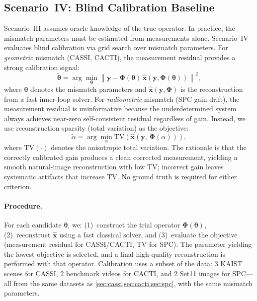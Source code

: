\documentclass[runningheads]{llncs}
\begin{document}


\subsection{Scenario~IV: Blind Calibration Baseline}
\label{sec:scenario_iv}

Scenario~III assumes oracle knowledge of the true operator.
In practice, the mismatch parameters must be estimated from measurements alone.
Scenario~IV evaluates blind calibration via grid search over mismatch parameters.
For \emph{geometric} mismatch (CASSI, CACTI), the measurement residual provides a strong calibration signal:
\begin{equation}
    \tilde{\boldsymbol{\theta}} = \arg\min_{\boldsymbol{\theta}} \left\| \mathbf{y} - \mathbf{\Phi}(\boldsymbol{\theta})\, \hat{\mathbf{x}}\!\left(\mathbf{y}, \mathbf{\Phi}(\boldsymbol{\theta})\right) \right\|^2,
    \label{eq:scenario_iv}
\end{equation}
where $\boldsymbol{\theta}$ denotes the mismatch parameters and $\hat{\mathbf{x}}(\mathbf{y}, \mathbf{\Phi})$ is the reconstruction from a fast inner-loop solver.
For \emph{radiometric} mismatch (SPC gain drift), the measurement residual is uninformative because the underdetermined system always achieves near-zero self-consistent residual regardless of gain.
Instead, we use reconstruction sparsity (total variation) as the objective:
\begin{equation}
    \tilde{\alpha} = \arg\min_{\alpha} \mathrm{TV}\!\left(\hat{\mathbf{x}}\!\left(\mathbf{y},\, \mathbf{\Phi}(\alpha)\right)\right),
    \label{eq:scenario_iv_tv}
\end{equation}
where $\mathrm{TV}(\cdot)$ denotes the anisotropic total variation.
The rationale is that the correctly calibrated gain produces a clean corrected measurement, yielding a smooth natural-image reconstruction with low TV; incorrect gain leaves systematic artifacts that increase TV.
No ground truth is required for either criterion.

\paragraph{Procedure.}
For each candidate $\boldsymbol{\theta}$, we: (1)~construct the trial operator $\mathbf{\Phi}(\boldsymbol{\theta})$, (2)~reconstruct $\hat{\mathbf{x}}$ using a fast classical solver, and (3)~evaluate the objective (measurement residual for CASSI/CACTI, TV for SPC).
The parameter yielding the lowest objective is selected, and a final high-quality reconstruction is performed with that operator.
Calibration uses a subset of the data: 3 KAIST scenes for CASSI, 2 benchmark videos for CACTI, and 2 Set11 images for SPC---all from the same datasets as \cref{sec:cassi,sec:cacti,sec:spc}, with the same mismatch parameters.
\end{document}

